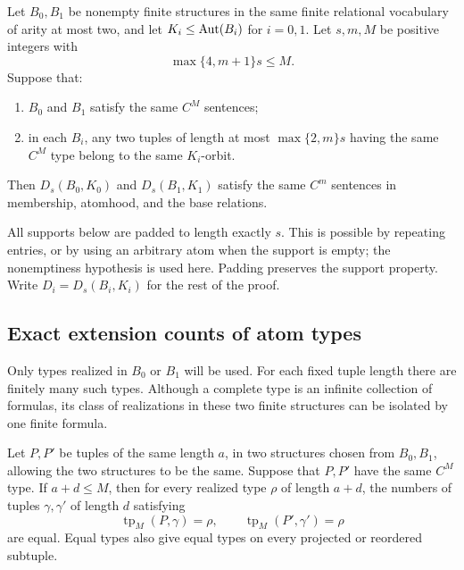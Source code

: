 \begin{theorem}
\label{hf:transfer}
Let $B_0,B_1$ be nonempty finite structures in the same finite relational
vocabulary of arity at most two, and let
$K_i\leq\operatorname{Aut}(B_i)$ for $i=0,1$.
Let $s,m,M$ be positive integers with
\[
                         \max\{4,m+1\}s\leq M.
\]
Suppose that:
\begin{enumerate}
\item $B_0$ and $B_1$ satisfy the same $C^M$ sentences;
\item in each $B_i$, any two tuples of length at most
      $\max\{2,m\}s$ having the same $C^M$ type belong to the same
      $K_i$-orbit.
\end{enumerate}
Then $D_s(B_0,K_0)$ and $D_s(B_1,K_1)$ satisfy the same $C^m$ sentences
in membership, atomhood, and the base relations.
\end{theorem}

All supports below are padded to length exactly $s$.
This is possible by repeating entries, or by using an arbitrary atom
when the support is empty; the nonemptiness hypothesis is used here.
Padding preserves the support property.  Write
$D_i=D_s(B_i,K_i)$ for the rest of the proof.

\subsection{Exact extension counts of atom types}

Only types realized in $B_0$ or $B_1$ will be used.  For each fixed tuple
length there are finitely many such types.  Although a complete type is
an infinite collection of formulas, its class of realizations in these
two finite structures can be isolated by one finite formula.

\begin{lemma}
\label{hf:extension-counts}
Let $P,P'$ be tuples of the same length $a$, in two structures chosen
from $B_0,B_1$, allowing the two structures to be the same.
Suppose that $P,P'$ have the same $C^M$ type.
If $a+d\leq M$, then for every realized type $\rho$ of length $a+d$,
the numbers of tuples $\gamma,\gamma'$ of length $d$ satisfying
\[
 \operatorname{tp}_M(P,\gamma)=\rho,
 \qquad
 \operatorname{tp}_M(P',\gamma')=\rho
\]
are equal.  Equal types also give equal types on every projected or
reordered subtuple.
\end{lemma}

